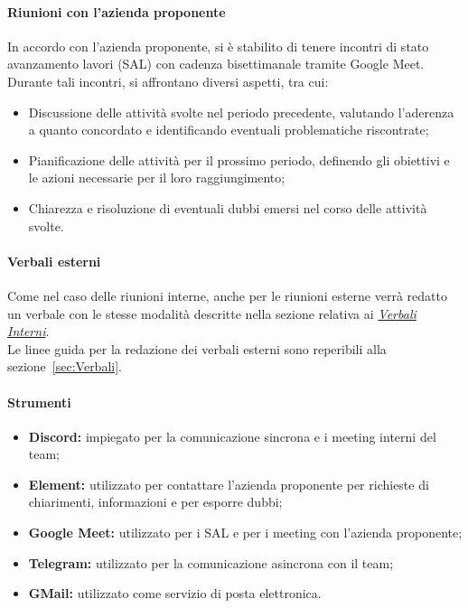 \paragraph*{Riunioni con l'azienda proponente}
In accordo con l'azienda proponente, si è stabilito di tenere incontri di stato avanzamento lavori (SAL) con cadenza bisettimanale tramite Google Meet. \\
Durante tali incontri, si affrontano diversi aspetti, tra cui:
\begin{itemize}
    \item Discussione delle attività svolte nel periodo precedente, valutando l'aderenza a quanto concordato e identificando eventuali problematiche riscontrate;
    \item Pianificazione delle attività per il prossimo periodo, definendo gli obiettivi e le azioni necessarie per il loro raggiungimento;
    \item Chiarezza e risoluzione di eventuali dubbi emersi nel corso delle attività svolte.
\end{itemize}

\paragraph*{Verbali esterni}
Come nel caso delle riunioni interne, anche per le riunioni esterne verrà redatto un verbale con le stesse modalità descritte nella sezione relativa ai \hyperlink{par:verbaliInterni}{\textit{Verbali Interni}}. \\
Le linee guida per la redazione dei verbali esterni sono reperibili alla sezione~\ref{sec:Verbali}.

\paragraph{Strumenti}
\begin{itemize}
  \item \textbf{Discord:} impiegato per la comunicazione sincrona e i meeting interni del team;
  \item \textbf{Element:} utilizzato per contattare l'azienda proponente per richieste di chiarimenti, informazioni e per esporre dubbi;
  \item \textbf{Google Meet:} utilizzato per i SAL e per i meeting con l'azienda proponente;
  \item \textbf{Telegram:} utilizzato per la comunicazione asincrona con il team;
  \item \textbf{GMail:} utilizzato come servizio di posta elettronica.
\end{itemize}

